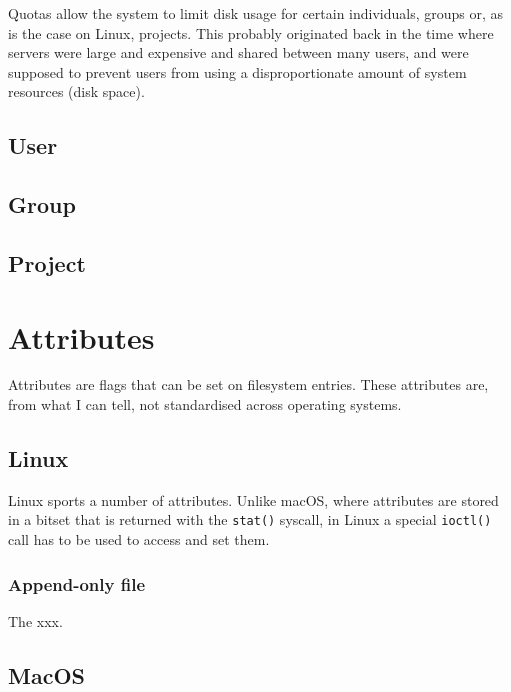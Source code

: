\documentclass[a4paper]{article}
\begin{document}
Quotas allow the system to limit disk usage for certain individuals, groups or, as is the case on Linux, projects. This probably originated back in the time where servers were large and expensive and shared between many users, and were supposed to prevent users from using a disproportionate amount of system resources (disk space).

\subsection{User}

\subsection{Group}

\subsection{Project}


\section{Attributes}

Attributes are flags that can be set on filesystem entries. These attributes are, from what I can tell, not standardised across operating systems. 

\subsection{Linux}

Linux sports a number of attributes. Unlike macOS, where attributes are stored in a bitset that is returned with the \verb|stat()| syscall, in Linux a special \verb|ioctl()| call has to be used to access and set them.


\subsubsection{Append-only file}

The xxx.

\subsection{MacOS}
\end{document}
